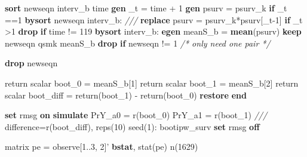 \documentclass[
  10pt,
]{book}
\newenvironment{Shaded}{\begin{snugshade}}{\end{snugshade}}
\newcommand{\CommentTok}[1]{\textcolor[rgb]{0.56,0.35,0.01}{\textit{#1}}}
\newcommand{\DecValTok}[1]{\textcolor[rgb]{0.00,0.00,0.81}{#1}}
\newcommand{\FunctionTok}[1]{\textcolor[rgb]{0.00,0.00,0.00}{#1}}
\newcommand{\KeywordTok}[1]{\textcolor[rgb]{0.13,0.29,0.53}{\textbf{#1}}}
\newcommand{\NormalTok}[1]{#1}
\begin{document}
\begin{Shaded}
\begin{Highlighting}[]
\KeywordTok{sort}\NormalTok{ newseqn interv_b time}
\KeywordTok{gen}\NormalTok{ _t = time + 1}
\KeywordTok{gen}\NormalTok{ psurv = psurv_k }\KeywordTok{if}\NormalTok{ _t ==1 		}
\KeywordTok{bysort}\NormalTok{ newseqn interv_b: }\CommentTok{///}
  \KeywordTok{replace}\NormalTok{ psurv = psurv_k*psurv[_t-1] }\KeywordTok{if}\NormalTok{ _t >1 }
\KeywordTok{drop} \KeywordTok{if}\NormalTok{ time != 119}
\KeywordTok{bysort}\NormalTok{ interv_b: }\KeywordTok{egen}\NormalTok{ meanS_b = }\KeywordTok{mean}\NormalTok{(psurv)}
\KeywordTok{keep}\NormalTok{ newseqn qsmk  meanS_b }
\KeywordTok{drop} \KeywordTok{if}\NormalTok{ newseqn != 1  }\CommentTok{/* only need one pair */}
	
\KeywordTok{drop}\NormalTok{ newseqn 		}
		
\FunctionTok{return} \FunctionTok{scalar}\NormalTok{ boot_0 = meanS_b[1]}
\FunctionTok{return} \FunctionTok{scalar}\NormalTok{ boot_1 = meanS_b[2]}
\FunctionTok{return} \FunctionTok{scalar}\NormalTok{  boot_diff = }\FunctionTok{return}\NormalTok{(boot_1) - }\FunctionTok{return}\NormalTok{(boot_0)}
\KeywordTok{restore}
\KeywordTok{end}		

\KeywordTok{set} \DecValTok{rmsg} \KeywordTok{on}
\KeywordTok{simulate}\NormalTok{ PrY_a0 = }\FunctionTok{r}\NormalTok{(boot_0) PrY_a1 = }\FunctionTok{r}\NormalTok{(boot_1) }\CommentTok{///}
\NormalTok{  difference=}\FunctionTok{r}\NormalTok{(boot_diff), reps(10) }\DecValTok{seed}\NormalTok{(1): bootipw_surv}
\KeywordTok{set} \DecValTok{rmsg} \KeywordTok{off} 
 
\FunctionTok{matrix}\NormalTok{ pe = observe[1..3, 2]'}
\KeywordTok{bstat}\NormalTok{, stat(pe) n(1629)}
\end{Highlighting}
\end{Shaded}
\end{document}
